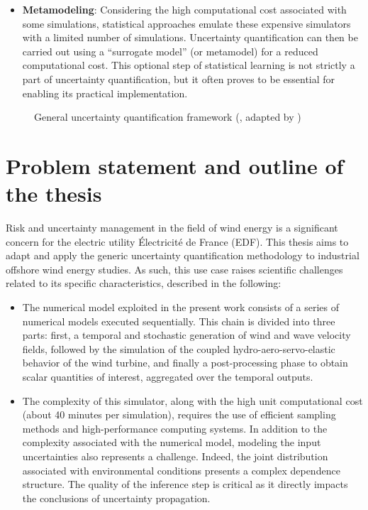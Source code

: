 \begin{itemize}
    \item \textbf{Metamodeling}: 
    Considering the high computational cost associated with some simulations, statistical approaches emulate these expensive simulators with a limited number of simulations. 
    Uncertainty quantification can then be carried out using a ``surrogate model'' (or metamodel) for a reduced computational cost. 
    This optional step of statistical learning is not strictly a part of uncertainty quantification, but it often proves to be essential for enabling its practical implementation.
\end{itemize}


\begin{figure}[!h]
    \centering
    
    \caption{General uncertainty quantification framework (\cite{rocquigny_2008}, adapted by \cite{ajenjo_2023})}
    \label{fig:UQ_methodo}
\end{figure}


\section*{Problem statement and outline of the thesis}

Risk and uncertainty management in the field of wind energy is a significant concern for the electric utility Électricité de France (EDF). 
This thesis aims to adapt and apply the generic uncertainty quantification methodology to industrial offshore wind energy studies. 
As such, this use case raises scientific challenges related to its specific characteristics, described in the following:
\begin{itemize}
    \item The numerical model exploited in the present work consists of a series of numerical models executed sequentially. 
    This chain is divided into three parts: first, a temporal and stochastic generation of wind and wave velocity fields, 
    followed by the simulation of the coupled hydro-aero-servo-elastic behavior of the wind turbine, 
    and finally a post-processing phase to obtain scalar quantities of interest, aggregated over the temporal outputs. 
    \item The complexity of this simulator, along with the high unit computational cost (about 40 minutes per simulation), requires the use of efficient sampling methods and high-performance computing systems. 
    In addition to the complexity associated with the numerical model, modeling the input uncertainties also represents a challenge. 
    Indeed, the joint distribution associated with environmental conditions presents a complex dependence structure.   
    The quality of the inference step is critical as it directly impacts the conclusions of uncertainty propagation.
\end{itemize}

